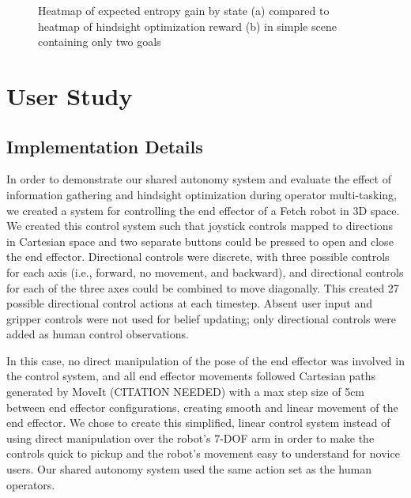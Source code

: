 \documentclass[conference]{IEEEtran}
\begin{document}
\begin{figure}
\caption{Heatmap of expected entropy gain by state (a) compared to heatmap of hindsight optimization reward (b) in simple scene containing only two goals}
\label{heatmap3}
\end{figure}

\section{User Study}

\subsection{Implementation Details}\label{implementation}
In order to demonstrate our shared autonomy system and evaluate the effect of information gathering and hindsight optimization during operator multi-tasking, we created a system for controlling the end effector of a Fetch robot in 3D space. We created this control system such that joystick controls mapped to directions in Cartesian space and two separate buttons could be pressed to open and close the end effector. Directional controls were discrete, with three possible controls for each axis (i.e., forward, no movement, and backward), and directional controls for each of the three axes could be combined to move diagonally. This created 27 possible directional control actions at each timestep. Absent user input and gripper controls were not used for belief updating; only directional controls were added as human control observations.

In this case, no direct manipulation of the pose of the end effector was involved in the control system, and all end effector movements followed Cartesian paths generated by MoveIt (CITATION NEEDED) with a max step size of 5cm between end effector configurations, creating smooth and linear movement of the end effector. We chose to create this simplified, linear control system instead of using direct manipulation over the robot's 7-DOF arm in order to make the controls quick to pickup and the robot's movement easy to understand for novice users. Our shared autonomy system used the same action set as the human operators.
\end{document}
